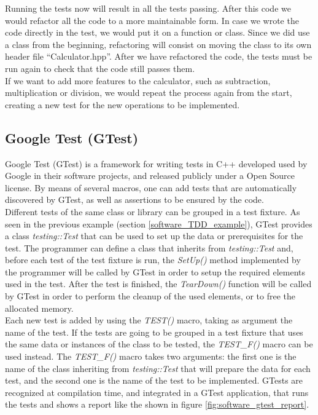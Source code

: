 Running the tests now will result in all the tests passing. After this code we would refactor all the code to a more maintainable form. In case we wrote the code directly in the test, we would put it on a function or class. Since we did use a class from the beginning, refactoring will consist on moving the class to its own header file ``Calculator.hpp''. After we have refactored the code, the tests must be run again to check that the code still passes them. \\

If we want to add more features to the calculator, such as subtraction, multiplication or division, we would repeat the process again from the start, creating a new test for the new operations to be implemented.\\

\subsection{Google Test (GTest)}
\label{software_gtest}
Google Test (GTest) \cite{gtest:website} is a framework for writing tests in C++ developed used by Google in their software projects, and released publicly under a Open Source license. By means of several macros, one can add tests that are automatically discovered by GTest, as well as assertions to be ensured by the code.\\

Different tests of the same class or library can be grouped in a test fixture. As seen in the previous example (section \ref{software_TDD_example}), GTest provides a class \emph{testing::Test} that can be used to set up the data or prerequisites for the test. The programmer can define a class that inherits from \emph{testing::Test} and, before each test of the test fixture is run, the \emph{SetUp()} method implemented by the programmer will be called by GTest in order to setup the required elements used in the test. After the test is finished, the \emph{TearDown()} function will be called by GTest in order to perform the cleanup of the used elements, or to free the allocated memory.\\

Each new test is added by using the \emph{TEST()} macro, taking as argument the name of the test. If the tests are going to be grouped in a test fixture that uses the same data or instances of the class to be tested, the \emph{TEST\_F()} macro can be used instead. The \emph{TEST\_F()} macro takes two arguments: the first one is the name of the class inheriting from \emph{testing::Test} that will prepare the data for each test, and the second one is the name of the test to be implemented. GTests are recognized at compilation time, and integrated in a GTest application, that runs the tests and shows a report like the shown in figure \ref{fig:software_gtest_report}. \\

